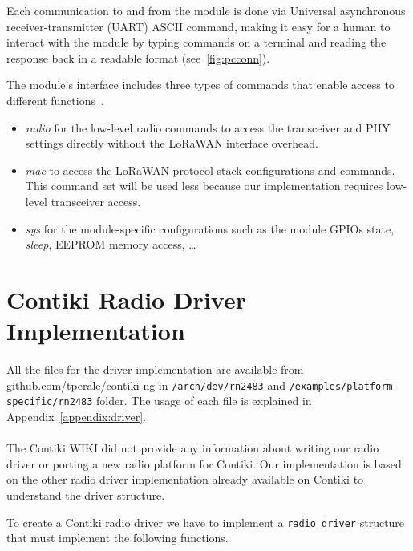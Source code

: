 Each communication to and from the module is done via Universal asynchronous receiver-transmitter (UART) ASCII command,
making it easy for a human to interact with the module by typing commands
on a terminal and reading the response back in a readable format
(see~\ref{fig:pcconn}).



The module's interface includes three types of commands that enable access to
different functions~\cite{microchip:reference}.

\begin{itemize}
  \item \emph{radio} for the low-level radio commands to access the transceiver
    and PHY settings directly without the LoRaWAN interface overhead.
  \item \emph{mac} to access the LoRaWAN protocol stack configurations and
    commands. This command set will be used less because our implementation
    requires low-level transceiver access.
  \item \emph{sys} for the module-specific configurations such as the module
    GPIOs state, \emph{sleep}, EEPROM memory access, \ldots
\end{itemize}

\section{Contiki Radio Driver Implementation}

All the files for the driver implementation are available from
\href{https://github.com/tperale/contiki-ng}{github.com/tperale/contiki-ng}
in \lstinline{/arch/dev/rn2483} and
\lstinline{/examples/platform-specific/rn2483} folder.
The usage of each file is explained in Appendix~\ref{appendix:driver}.

\paragraph{}

The Contiki WIKI did not provide any information about writing our radio driver
or porting a new radio platform for Contiki.
Our implementation is based on the other radio driver implementation already
available on Contiki to understand the driver structure.

To create a Contiki radio driver we have to implement a \lstinline{radio_driver}
structure that must implement the following functions.

